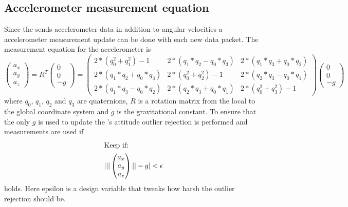 \subsection{Accelerometer measurement equation}
Since the \abbrIMU sends accelerometer data in addition to angular velocities a accelerometer measurement update can be done with each new \abbrIMU data packet. The measurement equation for the accelerometer is
\begin{equation}
    \begin{pmatrix}
    a_x\\
    a_y\\
    a_z
    \end{pmatrix}
    =
    R^T
    \begin{pmatrix}
    0\\
    0\\
    -g
    \end{pmatrix}
    =
    \begin{pmatrix}
        2*(q_0^2+q_1^2) - 1 &  2*(q_1*q_2-q_0*q_3) &    2*(q_1*q_3+q_0*q_2)\\
        2*(q_1*q_2+q_0*q_3) &    2*(q_0^2+q_2^2) - 1 &  2*(q_2*q_3-q_0*q_1)\\
        2*(q_1*q_3-q_0*q_2) &    2*(q_2*q_3+q_0*q_1) &    2*(q_0^2+q_3^2) - 1
    \end{pmatrix}
    \begin{pmatrix}
        0\\
        0\\
        -g
    \end{pmatrix}
\end{equation}
    where $q_0$, $q_1$, $q_2$ and $q_3$ are quaternions, $R$ is a rotation matrix from the local to the global coordinate system and $g$ is the gravitational constant.
    To ensure that the only $g$ is used to update the \abbrROV's attitude outlier rejection is performed and measurements are used if 
\begin{align*}
    \intertext{Keep if: }
    | ||
    \begin{pmatrix}
        a_x\\
        a_y\\
        a_z
    \end{pmatrix}||
    -g
     | < \epsilon
\end{align*} holds.
Here epsilon is a design variable that tweaks how harsh the outlier rejection should be.

